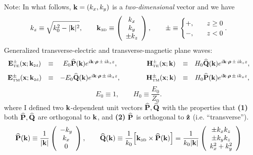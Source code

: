 \documentclass[letterpaper]{article}
\newcommand{\wh}{\widehat}
\begin{document}
Note: In what follows,
$\mathbf{k}=(k_x,k_y)$ is a \textit{two-dimensional} vector and we have
$$ k_z \equiv \sqrt{k_0^2 - |\mathbf{k}|^2}, 
   \qquad
   \mathbf{k}_{\hbox{\tiny{3D}}}\equiv
   \left(\begin{array}{c}k_x \\ k_y \\ \pm k_z \end{array}\right), 
   \qquad
   \pm \equiv
   \begin{cases}
     +, \quad & z\ge 0 \\ 
     -, \quad & z<   0
   \end{cases}.
$$
Generalized transverse-electric and transverse-magnetic plane waves:
$$\begin{array}{ccccccc}
 \mathbf{E}^{\pm} _{\hbox{\tiny{TE}}}(\mathbf{x}; \mathbf{k}_{\hbox{\tiny{2d}}})
   &\equiv& E_0 \widehat{\mathbf{P}}(\mathbf{k}) e^{i\mathbf{k} \cdot \boldsymbol{\rho} \, \pm \, ik_z z},
   &\qquad&
 \mathbf{H}^{\pm} _{\hbox{\tiny{TE}}}(\mathbf{x}; \mathbf{k})
   &\equiv& H_0 \widehat{\mathbf{Q}}(\mathbf{k}) e^{i\mathbf{k} \cdot \boldsymbol{\rho} \, \pm \, ik_z z},
\\[8pt]
 \mathbf{E}^{\pm} _{\hbox{\tiny{TM}}}(\mathbf{x}; \mathbf{k}_{\hbox{\tiny{2d}}})
   &\equiv& -E_0 \widehat{\mathbf{Q}}(\mathbf{k}) e^{i\mathbf{k} \cdot \boldsymbol{\rho} \, \pm \, ik_z z},
   &\qquad&
 \mathbf{H}^{\pm} _{\hbox{\tiny{TM}}}(\mathbf{x}; \mathbf{k})
   &\equiv& H_0 \widehat{\mathbf{P}}(\mathbf{k}) e^{i\mathbf{k} \cdot \boldsymbol{\rho} \, \pm \, ik_z z},
\end{array}$$
$$ E_0 \equiv 1, \qquad H_0\equiv \frac{E_0}{Z_0}.$$
where I defined two $\mathbf{k}$-dependent unit vectors 
$\widehat{\mathbf{P}}, \widehat{\mathbf{Q}}$ with the properties 
that \textbf{(1)} both $\wh{\vb P}, \wh{\vb Q}$ are orthogonal to $\mathbf{k}$,
and 
\textbf{(2)} $\wh {\vb P}$ is orthogonal to $\mathbf{\hat z}$ (i.e. ``transverse'').
$$ \widehat{ \mathbf{P}}(\mathbf{k}) \equiv
   \frac{1}{|\mathbf{k}|}
   \left(\begin{array}{c}-k_y \\ k_x \\ 0 \end{array}\right),
   \qquad
   \widehat{\mathbf{Q}}(\mathbf{k}) \equiv
   \frac{1}{k_0}\Big[ \mathbf{k}_{\hbox{\tiny{3D}}} \times \widehat{\mathbf{P}}(\mathbf{k}) \Big]
   =
   \frac{1}{k_0 |\mathbf{k}|}
   \left(\begin{array}{c} \pm k_x k_z \\ \pm k_y k_z \\ k_x^2 + k_y^2 
         \end{array}\right)
$$
\end{document}
